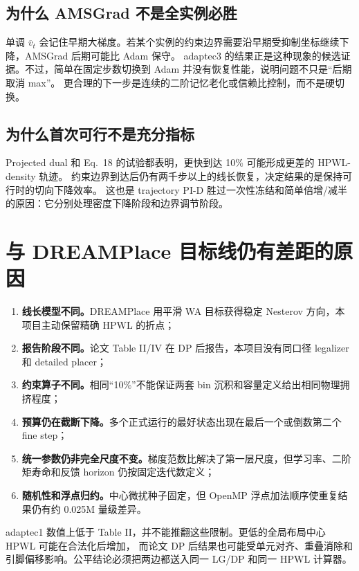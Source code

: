 \documentclass[UTF8,fontset=windows,a4paper,11pt]{ctexart}
\begin{document}
\subsection{为什么 AMSGrad 不是全实例必胜}

单调 $\overline v_t$ 会记住早期大梯度。若某个实例的约束边界需要沿早期受抑制坐标继续下降，AMSGrad 后期可能比 Adam 保守。
adaptec3 的结果正是这种现象的候选证据。不过，简单在固定步数切换到 Adam 并没有恢复性能，说明问题不只是“后期取消 max”。
更合理的下一步是连续的二阶记忆老化或信赖比控制，而不是硬切换。

\subsection{为什么首次可行不是充分指标}

Projected dual 和 Eq.~18 的试验都表明，更快到达 10\% 可能形成更差的 HPWL-density 轨迹。
约束边界到达后仍有两千步以上的线长恢复，决定结果的是保持可行时的切向下降效率。
这也是 trajectory PI-D 胜过一次性冻结和简单倍增/减半的原因：它分别处理密度下降阶段和边界调节阶段。

\section{与 DREAMPlace 目标线仍有差距的原因}

\begin{enumerate}
  \item \textbf{线长模型不同。}DREAMPlace 用平滑 WA 目标获得稳定 Nesterov 方向，本项目主动保留精确 HPWL 的折点；
  \item \textbf{报告阶段不同。}论文 Table II/IV 在 DP 后报告，本项目没有同口径 legalizer 和 detailed placer；
  \item \textbf{约束算子不同。}相同“10\%”不能保证两套 bin 沉积和容量定义给出相同物理拥挤程度；
  \item \textbf{预算仍在截断下降。}多个正式运行的最好状态出现在最后一个或倒数第二个 fine step；
  \item \textbf{统一参数仍非完全尺度不变。}梯度范数比解决了第一层尺度，但学习率、二阶矩寿命和反馈 horizon 仍按固定迭代数定义；
  \item \textbf{随机性和浮点归约。}中心微扰种子固定，但 OpenMP 浮点加法顺序使重复结果仍有约 0.025M 量级差异。
\end{enumerate}

adaptec1 数值上低于 Table II，并不能推翻这些限制。更低的全局布局中心 HPWL 可能在合法化后增加，
而论文 DP 后结果也可能受单元对齐、重叠消除和引脚偏移影响。公平结论必须把两边都送入同一 LG/DP 和同一 HPWL 计算器。
\end{document}
